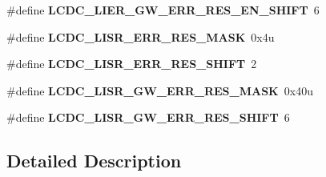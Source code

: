 \begin{DoxyCompactItemize}
\item 
\hypertarget{group___backward___compatibility___symbols_gac243ba34ffc70146d3351311517e9132}{}\#define {\bfseries L\+C\+D\+C\+\_\+\+L\+I\+E\+R\+\_\+\+G\+W\+\_\+\+E\+R\+R\+\_\+\+R\+E\+S\+\_\+\+E\+N\+\_\+\+S\+H\+I\+F\+T}~6\label{group___backward___compatibility___symbols_gac243ba34ffc70146d3351311517e9132}

\item 
\hypertarget{group___backward___compatibility___symbols_gab0d8b8fbe8f51eba85f1d1bdd8824162}{}\#define {\bfseries L\+C\+D\+C\+\_\+\+L\+I\+S\+R\+\_\+\+E\+R\+R\+\_\+\+R\+E\+S\+\_\+\+M\+A\+S\+K}~0x4u\label{group___backward___compatibility___symbols_gab0d8b8fbe8f51eba85f1d1bdd8824162}

\item 
\hypertarget{group___backward___compatibility___symbols_ga7bc999c67272e1fbecbd6a33087adc69}{}\#define {\bfseries L\+C\+D\+C\+\_\+\+L\+I\+S\+R\+\_\+\+E\+R\+R\+\_\+\+R\+E\+S\+\_\+\+S\+H\+I\+F\+T}~2\label{group___backward___compatibility___symbols_ga7bc999c67272e1fbecbd6a33087adc69}

\item 
\hypertarget{group___backward___compatibility___symbols_gabdf45b5b808028d474f47db3f2d82f6f}{}\#define {\bfseries L\+C\+D\+C\+\_\+\+L\+I\+S\+R\+\_\+\+G\+W\+\_\+\+E\+R\+R\+\_\+\+R\+E\+S\+\_\+\+M\+A\+S\+K}~0x40u\label{group___backward___compatibility___symbols_gabdf45b5b808028d474f47db3f2d82f6f}

\item 
\hypertarget{group___backward___compatibility___symbols_ga19ed1a8edba0925831833450843e5ba0}{}\#define {\bfseries L\+C\+D\+C\+\_\+\+L\+I\+S\+R\+\_\+\+G\+W\+\_\+\+E\+R\+R\+\_\+\+R\+E\+S\+\_\+\+S\+H\+I\+F\+T}~6\label{group___backward___compatibility___symbols_ga19ed1a8edba0925831833450843e5ba0}

\end{DoxyCompactItemize}


\subsection{Detailed Description}
